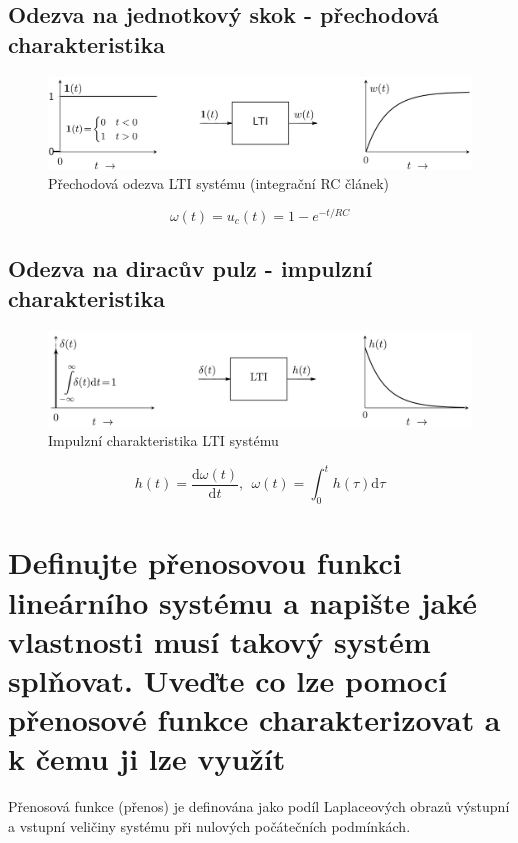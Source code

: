 \documentclass[a4paper,12pt]{article}   %
\begin{document}
\subsection*{Odezva na jednotkový skok - přechodová charakteristika}
\begin{figure}[h!]
    \centering
    \includegraphics[width=\textwidth]{prechodova_odezva.PNG}
    \caption{Přechodová  odezva LTI systému (integrační RC článek)}
\end{figure}
\begin{equation}
    \omega (t) = u_c(t) = 1-e^{-t/RC}
\end{equation}

\subsection*{Odezva na diracův pulz - impulzní charakteristika}
\begin{figure}[h!]
    \centering
    \includegraphics[width=\textwidth]{impusni_odezva.PNG}
    \caption{Impulzní charakteristika LTI systému}
\end{figure}
\begin{equation}
    h(t) = \frac{\text{d}\omega(t)}{\text{d}t},~~\omega(t) = \int_0^t h(\tau)\text{d}\tau
\end{equation}






\section{Definujte přenosovou funkci lineárního systému a napište jaké vlastnosti musí takový systém splňovat. Uveďte co lze pomocí přenosové funkce charakterizovat a k čemu ji lze využít}
Přenosová funkce (přenos) je definována jako podíl Laplaceových obrazů výstupní a vstupní veličiny systému při nulových počátečních podmínkách.
\end{document}
